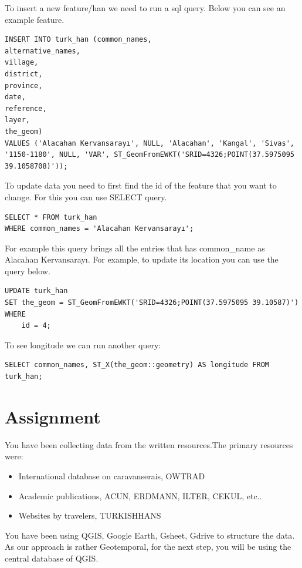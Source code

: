 \documentclass[
]{book}
\providecommand{\tightlist}{%
  \setlength{\itemsep}{0pt}\setlength{\parskip}{0pt}}
\begin{document}
To insert a new feature/han we need to run a sql query. Below you can see an example feature.

\begin{verbatim}
INSERT INTO turk_han (common_names, 
alternative_names, 
village, 
district, 
province, 
date, 
reference, 
layer, 
the_geom) 
VALUES ('Alacahan Kervansarayı', NULL, 'Alacahan', 'Kangal', 'Sivas', '1150-1180', NULL, 'VAR', ST_GeomFromEWKT('SRID=4326;POINT(37.5975095 39.1058708)'));
\end{verbatim}

To update data you need to first find the id of the feature that you want to change. For this you can use SELECT query.

\begin{verbatim}
SELECT * FROM turk_han
WHERE common_names = 'Alacahan Kervansarayı';
\end{verbatim}

For example this query brings all the entries that has common\_name as Alacahan Kervansarayı. For example, to update its location you can use the query below.

\begin{verbatim}
UPDATE turk_han
SET the_geom = ST_GeomFromEWKT('SRID=4326;POINT(37.5975095 39.10587)')
WHERE
    id = 4;
\end{verbatim}

To see longitude we can run another query:

\begin{verbatim}
SELECT common_names, ST_X(the_geom::geometry) AS longitude FROM turk_han;
\end{verbatim}

\hypertarget{assignment}{%
\chapter{Assignment}\label{assignment}}

You have been collecting data from the written resources.The primary resources were:

\begin{itemize}
\tightlist
\item
  International database on caravanserais, OWTRAD
\item
  Academic publications, ACUN, ERDMANN, ILTER, CEKUL, etc..
\item
  Websites by travelers, TURKISHHANS
\end{itemize}

You have been using QGIS, Google Earth, Gsheet, Gdrive to structure the data. As our approach is rather Geotemporal, for the next step, you will be using the central database of QGIS.
\end{document}
